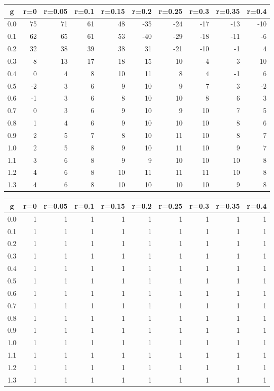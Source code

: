 %
\begin{table}[!tbp]
 \begin{center}
 \begin{tabular}{rrrrrrrrrr}\hline\hline
\multicolumn{1}{c}{g}&\multicolumn{1}{c}{r=0}&\multicolumn{1}{c}{r=0.05}&\multicolumn{1}{c}{r=0.1}&\multicolumn{1}{c}{r=0.15}&\multicolumn{1}{c}{r=0.2}&\multicolumn{1}{c}{r=0.25}&\multicolumn{1}{c}{r=0.3}&\multicolumn{1}{c}{r=0.35}&\multicolumn{1}{c}{r=0.4}\tabularnewline
\hline
0.0&75&71&61&48&-35&-24&-17&-13&-10\tabularnewline
0.1&62&65&61&53&-40&-29&-18&-11& -6\tabularnewline
0.2&32&38&39&38& 31&-21&-10& -1&  4\tabularnewline
0.3& 8&13&17&18& 15& 10& -4&  3& 10\tabularnewline
0.4& 0& 4& 8&10& 11&  8&  4& -1&  6\tabularnewline
0.5&-2& 3& 6& 9& 10&  9&  7&  3& -2\tabularnewline
0.6&-1& 3& 6& 8& 10& 10&  8&  6&  3\tabularnewline
0.7& 0& 3& 6& 9& 10&  9& 10&  7&  5\tabularnewline
0.8& 1& 4& 6& 9& 10& 10& 10&  8&  6\tabularnewline
0.9& 2& 5& 7& 8& 10& 11& 10&  8&  7\tabularnewline
1.0& 2& 5& 8& 9& 10& 11& 10&  9&  7\tabularnewline
1.1& 3& 6& 8& 9&  9& 10& 10& 10&  8\tabularnewline
1.2& 4& 6& 8&10& 11& 11& 11& 10&  8\tabularnewline
1.3& 4& 6& 8&10& 10& 10& 10&  9&  8\tabularnewline
\hline
\end{tabular}

\end{center}

\end{table}

%
\begin{table}[!tbp]
 \begin{center}
 \begin{tabular}{rrrrrrrrrr}\hline\hline
\multicolumn{1}{c}{g}&\multicolumn{1}{c}{r=0}&\multicolumn{1}{c}{r=0.05}&\multicolumn{1}{c}{r=0.1}&\multicolumn{1}{c}{r=0.15}&\multicolumn{1}{c}{r=0.2}&\multicolumn{1}{c}{r=0.25}&\multicolumn{1}{c}{r=0.3}&\multicolumn{1}{c}{r=0.35}&\multicolumn{1}{c}{r=0.4}\tabularnewline
\hline
0.0&1&1&1&1&1&1&1&1&1\tabularnewline
0.1&1&1&1&1&1&1&1&1&1\tabularnewline
0.2&1&1&1&1&1&1&1&1&1\tabularnewline
0.3&1&1&1&1&1&1&1&1&1\tabularnewline
0.4&1&1&1&1&1&1&1&1&1\tabularnewline
0.5&1&1&1&1&1&1&1&1&1\tabularnewline
0.6&1&1&1&1&1&1&1&1&1\tabularnewline
0.7&1&1&1&1&1&1&1&1&1\tabularnewline
0.8&1&1&1&1&1&1&1&1&1\tabularnewline
0.9&1&1&1&1&1&1&1&1&1\tabularnewline
1.0&1&1&1&1&1&1&1&1&1\tabularnewline
1.1&1&1&1&1&1&1&1&1&1\tabularnewline
1.2&1&1&1&1&1&1&1&1&1\tabularnewline
1.3&1&1&1&1&1&1&1&1&1\tabularnewline
\hline
\end{tabular}

\end{center}

\end{table}

